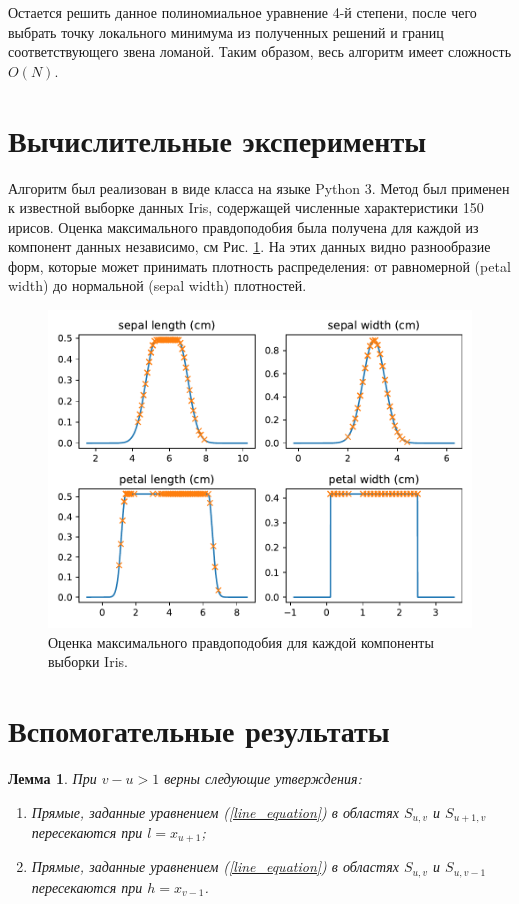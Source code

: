 \documentclass[12pt]{article}
\theoremstyle{definition}
\theoremstyle{plain}
\newtheorem{lemma}{Лемма}
\begin{document}
Остается решить данное полиномиальное уравнение 4-й степени, после чего
выбрать точку локального минимума из полученных решений и границ 
соответствующего звена ломаной. Таким образом, весь алгоритм имеет
сложность $O(N)$.

\section{Вычислительные эксперименты}
Алгоритм был реализован в виде класса на языке Python 3. 
Метод был применен к известной выборке данных Iris, содержащей
численные характеристики 150 ирисов.
Оценка максимального правдоподобия была получена для каждой из компонент
данных независимо, см Рис. \ref{iris}. На этих данных видно разнообразие форм,
которые может принимать плотность распределения: от равномерной
(petal width) до нормальной (sepal width) плотностей.

\begin{figure}[H]
\centering
\includegraphics[width=0.6\linewidth]{iris.pdf}
\caption{Оценка максимального правдоподобия для каждой компоненты выборки Iris.}
\label{iris}
\end{figure}


\section{Вспомогательные результаты}

\begin{lemma}
\label{line_intersections}
При $v - u > 1$ верны следующие утверждения:
\begin{enumerate}
\item Прямые, заданные уравнением (\ref{line_equation}) в областях 
$S_{u, v}$ и $S_{u+1, v}$ пересекаются при $l = x_{u+1}$;
\item Прямые, заданные уравнением (\ref{line_equation}) в областях 
$S_{u, v}$ и $S_{u, v-1}$ пересекаются при $h = x_{v-1}$.
\end{enumerate}
\end{lemma}
\end{document}
